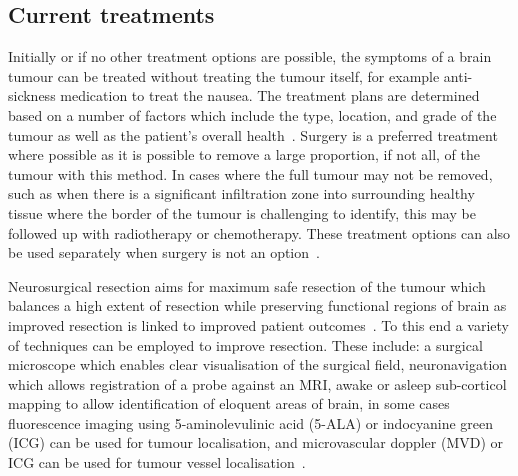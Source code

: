 \subsection{Current treatments}\label{sec:introtumourtreatments}
Initially or if no other treatment options are possible, the symptoms of a brain tumour can be treated without treating the tumour itself, for example anti-sickness medication to treat the nausea. The treatment plans are determined based on a number of factors which include the type, location, and grade of the tumour as well as the patient's overall health~\citep{NationalHealthService2023}. Surgery is a preferred treatment where possible as it is possible to remove a large proportion, if not all, of the tumour with this method. In cases where the full tumour may not be removed, such as when there is a significant infiltration zone into surrounding healthy tissue where the border of the tumour is challenging to identify, this may be followed up with radiotherapy or chemotherapy. These treatment options can also be used separately when surgery is not an option~\citep{MacmillanCancerSupport2019}. 

Neurosurgical resection aims for maximum safe resection of the tumour which balances a high extent of resection while preserving functional regions of brain as improved resection is linked to improved patient outcomes~\citep{Chanbour2022}. To this end a variety of techniques can be employed to improve resection. These include: a surgical microscope which enables clear visualisation of the surgical field, neuronavigation which allows registration of a probe against an MRI, awake or asleep sub-corticol mapping to allow identification of eloquent areas of brain, in some cases fluorescence imaging using 5-aminolevulinic acid (5-ALA) or indocyanine green (ICG) can be used for tumour localisation, and microvascular doppler (MVD) or ICG can be used for tumour vessel localisation~\citep{Chanbour2022, Catapano2018}.

